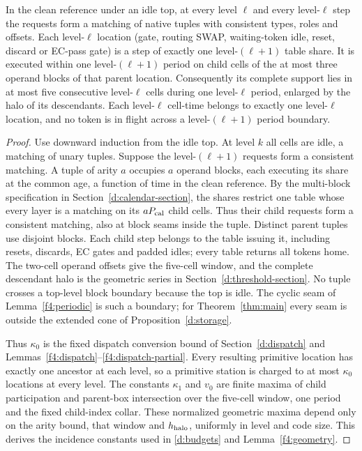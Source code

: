 \begin{lemma}\label{d:ownership}
In the clean reference under an idle top, at every level \(\ell\)
and every level-\(\ell\) step the requests form a matching of native
tuples with consistent types, roles and offsets. Each level-\(\ell\)
location (gate, routing SWAP, waiting-token idle, reset, discard or
EC-pass gate) is a step of exactly one level-\((\ell+1)\) table share.
It is executed within one level-\((\ell+1)\) period on child cells
of the at most three operand blocks of that parent location.
Consequently its complete support lies in at most five consecutive
level-\(\ell\) cells during one level-\(\ell\) period, enlarged by
the halo of its descendants. Each level-\(\ell\) cell-time belongs
to exactly one level-\(\ell\) location, and no token is in flight
across a level-\((\ell+1)\) period boundary.
\end{lemma}
\begin{proof}
Use downward induction from the idle top. At level \(k\) all cells
are idle, a matching of unary tuples. Suppose the level-\((\ell+1)\)
requests form a consistent matching. A tuple of arity \(a\) occupies
\(a\) operand blocks, each executing its share at the common age,
a function of time in the clean reference. By the multi-block
specification in Section~\ref{d:calendar-section}, the shares restrict
one table whose every layer is a matching on its \(aP_{\rm cal}\)
child cells. Thus their child requests form a consistent matching,
also at block seams inside the tuple. Distinct parent tuples use
disjoint blocks. Each child step belongs to the table issuing it,
including resets, discards, EC gates and padded idles; every table
returns all tokens home. The two-cell operand offsets give the
five-cell window, and the complete descendant halo is the geometric
series in Section~\ref{d:threshold-section}. No tuple crosses a
top-level block boundary because the top is idle. The cyclic seam
of Lemma~\ref{f4:periodic} is such a boundary; for Theorem~\ref{thm:main}
every seam is outside the extended cone of Proposition~\ref{d:storage}.

Thus \(\kappa_0\) is the fixed dispatch conversion bound of
Section~\ref{d:dispatch} and Lemmas~\ref{f4:dispatch}--\ref{f4:dispatch-partial}.
Every resulting primitive location has exactly one ancestor at each
level, so a primitive station is charged to at most \(\kappa_0\)
locations at every level. The constants \(\kappa_1\) and \(v_0\)
are finite maxima of child participation and parent-box intersection
over the five-cell window, one period and the fixed child-index collar.
These normalized geometric maxima depend only on the arity bound,
that window and \(h_{\rm halo}\), uniformly in level and code size.
This derives the incidence constants used in \eqref{d:budgets} and
Lemma~\ref{f4:geometry}.
\end{proof}

